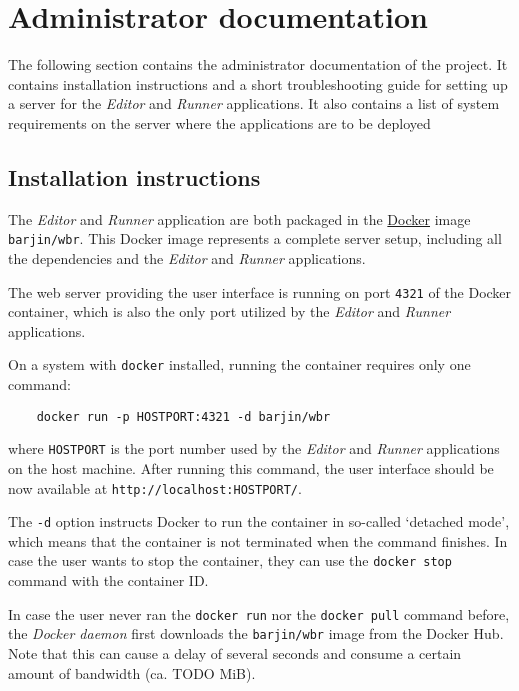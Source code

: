 
\section{Administrator documentation}

The following section contains the administrator documentation of the project.
It contains installation instructions and a short troubleshooting guide for setting up a server for the \textit{Editor} and \textit{Runner} applications. 
It also contains a list of system requirements on the server where the applications are to be deployed

\subsection{Installation instructions}

The \textit{Editor} and \textit{Runner} application are both packaged in the \href{https://www.docker.com/}{Docker} image \texttt{barjin/wbr}.
This Docker image represents a complete server setup, including all the dependencies and the \textit{Editor} and \textit{Runner} applications.

The web server providing the user interface is running on port \texttt{4321} of the Docker container, which is also the only port utilized by the \textit{Editor} and \textit{Runner} applications.

On a system with \texttt{docker} installed, running the container requires only one command:
\begin{verbatim}
    docker run -p HOSTPORT:4321 -d barjin/wbr
\end{verbatim}
where \texttt{HOSTPORT} is the port number used by the \textit{Editor} and \textit{Runner} applications on the host machine.
After running this command, the user interface should be now available at \texttt{http://localhost:HOSTPORT/}.

The \texttt{-d} option instructs Docker to run the container in so-called `detached mode', which means that the container is not terminated when the command finishes. 
In case the user wants to stop the container, they can use the \texttt{docker stop} command with the container ID.

In case the user never ran the \texttt{docker run} nor the \texttt{docker pull} command before, the \textit{Docker daemon} first downloads the \texttt{barjin/wbr} image from the Docker Hub.
Note that this can cause a delay of several seconds and consume a certain amount of bandwidth (ca. TODO MiB).

